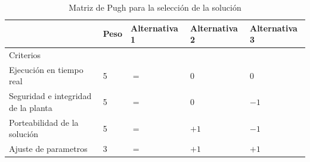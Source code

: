 \documentclass[12pt]{article}
\begin{document}
\begin{table}[!h]
  \centering
  \caption{Matriz de Pugh para la selección de la solución}
  \label{tab:pugh}
  \begin{tabular}{lllll}
    \cline{2-5}
    \multicolumn{1}{l|}{}                                                             & \multicolumn{1}{l|}{\cellcolor[HTML]{DAE8FC}Peso} & \multicolumn{1}{l|}{\cellcolor[HTML]{DAE8FC}Alternativa 1} & \multicolumn{1}{l|}{\cellcolor[HTML]{DAE8FC}Alternativa 2} & \multicolumn{1}{l|}{\cellcolor[HTML]{DAE8FC}Alternativa 3} \\ \hline
    \multicolumn{1}{|l|}{\cellcolor[HTML]{DAE8FC}Criterios}                           & \multicolumn{1}{l|}{\cellcolor[HTML]{CBCEFB}}     & \multicolumn{1}{l|}{}                                      & \multicolumn{1}{l|}{}                                      & \multicolumn{1}{l|}{}                                      \\ \hline
    \multicolumn{1}{|l|}{\cellcolor[HTML]{DAE8FC}Ejecución en tiempo real}            & \multicolumn{1}{l|}{\cellcolor[HTML]{CBCEFB}5}    & \multicolumn{1}{l|}{$=$}                                   & \multicolumn{1}{l|}{0}                                     & \multicolumn{1}{l|}{0}                                     \\ \hline
    \multicolumn{1}{|l|}{\cellcolor[HTML]{DAE8FC}Seguridad e integridad de la planta} & \multicolumn{1}{l|}{\cellcolor[HTML]{CBCEFB}5}    & \multicolumn{1}{l|}{$=$}                                   & \multicolumn{1}{l|}{0}                                     & \multicolumn{1}{l|}{$-1$}                                  \\ \hline
    \multicolumn{1}{|l|}{\cellcolor[HTML]{DAE8FC}Porteabilidad de la solución}        & \multicolumn{1}{l|}{\cellcolor[HTML]{CBCEFB}5}    & \multicolumn{1}{l|}{$=$}                                   & \multicolumn{1}{l|}{$+1$}                                  & \multicolumn{1}{l|}{$-1$}                                  \\ \hline
    \multicolumn{1}{|l|}{\cellcolor[HTML]{DAE8FC}Ajuste de parametros}                & \multicolumn{1}{l|}{\cellcolor[HTML]{CBCEFB}3}    & \multicolumn{1}{l|}{$=$}                                   & \multicolumn{1}{l|}{$+1$}                                  & \multicolumn{1}{l|}{$+1$}                                  \\ \hline

\end{tabular}
\end{table}
\end{document}
